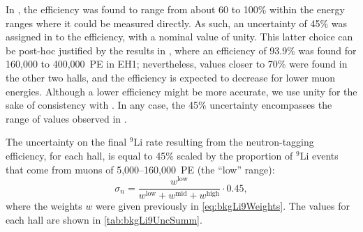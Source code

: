 \documentclass[../thesis.tex]{subfiles}
\begin{document}
In \cite{WeiLi9}, the efficiency was found to range from about 60 to 100\% within the energy ranges where it could be measured directly. As such, an uncertainty of 45\% was assigned in \cite{ChrisLi9} to the efficiency, with a nominal value of unity. This latter choice can be post-hoc justified by the results in \cite{MaWuLi9}, where an efficiency of 93.9\% was found for 160,000 to 400,000~PE in EH1; nevertheless, values closer to 70\% were found in the other two halls, and the efficiency is expected to decrease for lower muon energies. %
Although a lower efficiency might be more accurate, we use unity for the sake of consistency with \cite{ChrisLi9}. In any case,
the 45\% uncertainty encompasses the range of values observed in \cite{MaWuLi9}.


The uncertainty on the final $^9$Li rate resulting from the neutron-tagging efficiency, for each hall, is equal to 45\% scaled by the proportion of $^9$Li events that come from muons of 5,000--160,000~PE (the ``low'' range):
\begin{equation}
  \sigma_n = \frac{w^{\mathrm{low}}}{w^{\mathrm{low}} + w^{\mathrm{mid}} + w^{\mathrm{high}}} \cdot 0.45,
\end{equation}
where the weights $w$ were given previously in \autoref{eq:bkgLi9Weights}. The values for each hall are shown in \autoref{tab:bkgLi9UncSumm}.
\end{document}
